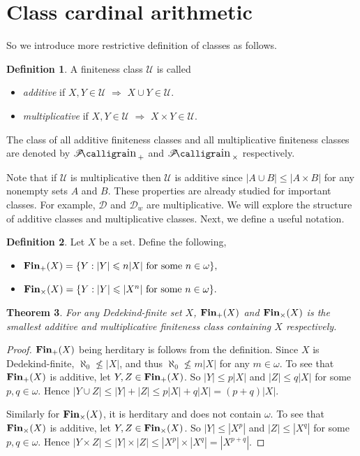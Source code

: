 \documentclass{amsart}
\DeclareMathOperator{\FFin}{\mathscr{F}\text{\kern -3pt {\calligra\large in}}\,}
\newcommand{\Fin}{\textbf{\textup{Fin}}}
\renewcommand{\leq}{\leqslant}
\renewcommand{\nleq}{\nleqslant}
\newcommand{\1}{\ensuremath{\mathds{1}}}
\theoremstyle{plain}
\newtheorem{thm}{Theorem}[section]
\theoremstyle{boldrk}
\theoremstyle{definition}
\newtheorem{defn}[thm]{Definition}
\begin{document}
\section{Class cardinal arithmetic}\label{s:closure}





So we introduce more restrictive definition of classes as follows.

\begin{defn}
    A finiteness class $\mathcal{U}$ is called
    \begin{itemize}
        \item \emph{additive} if $X,Y\in\mathcal{U}$ $\Rightarrow$ $X\cup Y\in\mathcal{U}$.
        \item \emph{multiplicative} if $X,Y\in\mathcal{U}$ $\Rightarrow$ $X\times Y\in\mathcal{U}$.
    \end{itemize}    
    The class of all additive finiteness classes and all multiplicative finiteness classes are denoted by $\FFin_{+}$ and $\FFin_{\times}$ respectively.
\end{defn}

Note that if $\mathcal{U}$ is multiplicative then $\mathcal{U}$ is additive since $|A\cup B|\leq|A\times B|$ for any nonempty sets $A$ and $B$. These properties are already studied for important classes. For example, $\mathcal{D}$ and $\mathcal{D}_{w}$ are multiplicative. We will explore the structure of additive classes and multiplicative classes. Next, we define a useful notation.

\begin{defn}
Let $X$ be a set. Define the following,
\begin{itemize}
    \item $\Fin_{+}(X)=\{Y:|Y|\leq n|X|\text{ for some }n\in\omega\},$
    \item $\Fin_{\times}(X)=\{Y:|Y|\leq |X^{n}|\text{ for some }n\in\omega\}.$
\end{itemize}
\end{defn}

\begin{thm}
 For any Dedekind-finite set $X$, $\Fin_{+}(X)$ and $\Fin_{\times}(X)$ is the smallest additive and multiplicative finiteness class containing $X$ respectively.   
\end{thm}

\begin{proof}
 $\Fin_{+}(X)$ being herditary is follows from the definition. Since $X$ is Dedekind-finite, $\aleph_{0}\nleq |X|$, and thus $\aleph_{0}\nleq m|X|$ for any $m\in\omega$. To see that $\Fin_{+}(X)$ is additive, let $Y,Z\in \Fin_{+}(X)$. So $|Y|\leq p|X|$ and $|Z|\leq q|X|$ for some $p,q\in\omega$. Hence $|Y\cup Z|\leq |Y|+|Z|\leq p|X|+q|X|=(p+q)|X|$. 

 Similarly for $\Fin_{\times}(X)$, it is herditary and does not contain $\omega$. To see that $\Fin_{\times}(X)$ is additive, let $Y,Z\in \Fin_{\times}(X)$. So $|Y|\leq |X^{p}|$ and $|Z|\leq |X^{q}|$ for some $p,q\in\omega$. Hence $|Y\times Z|\leq |Y|\times|Z|\leq |X^{p}|\times|X^{q}|=|X^{p+q}|$. 
\end{proof}
\end{document}
